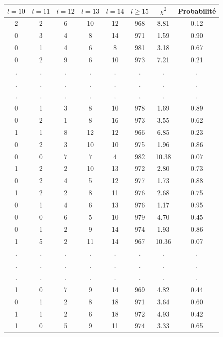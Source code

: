 \documentclass[12pt,a4paper]{article}
\begin{document}
\begin{center}
\begin{tabular}{|c|c|c|c|c|c|c|c|}
\hline
$l = 10$ & $l = 11$ & $l = 12$ & $l = 13$ & $l = 14$ & $l \geq 15$ & $\chi^2$ & Probabilité \\ \hline
2 & 2 & 6 & 10 & 12 & 968 &  8.81 &  0.12\\ \hline
0 & 3 & 4 & 8 & 14 & 971 &  1.59 &  0.90\\ \hline
0 & 1 & 4 & 6 & 8 & 981 &  3.18 &  0.67\\ \hline
0 & 2 & 9 & 6 & 10 & 973 &  7.21 &  0.21\\ \hline
 . & . & . & . & . & . & . & .\\ \hline
 . & . & . & . & . & . & . & .\\ \hline
 . & . & . & . & . & . & . & .\\ \hline
0 & 1 & 3 & 8 & 10 & 978 &  1.69 &  0.89\\ \hline
0 & 2 & 1 & 8 & 16 & 973 &  3.55 &  0.62\\ \hline
1 & 1 & 8 & 12 & 12 & 966 &  6.85 &  0.23\\ \hline
0 & 2 & 3 & 10 & 10 & 975 &  1.96 &  0.86\\ \hline
0 & 0 & 7 & 7 & 4 & 982 & 10.38 &  0.07\\ \hline
1 & 2 & 2 & 10 & 13 & 972 &  2.80 &  0.73\\ \hline
0 & 2 & 4 & 5 & 12 & 977 &  1.73 &  0.88\\ \hline
1 & 2 & 2 & 8 & 11 & 976 &  2.68 &  0.75\\ \hline
0 & 1 & 4 & 6 & 13 & 976 &  1.17 &  0.95\\ \hline
0 & 0 & 6 & 5 & 10 & 979 &  4.70 &  0.45\\ \hline
0 & 1 & 2 & 9 & 14 & 974 &  1.93 &  0.86\\ \hline
1 & 5 & 2 & 11 & 14 & 967 & 10.36 &  0.07\\ \hline
 . & . & . & . & . & . & . & .\\ \hline
 . & . & . & . & . & . & . & .\\ \hline
 . & . & . & . & . & . & . & .\\ \hline
1 & 0 & 7 & 9 & 14 & 969 &  4.82 &  0.44\\ \hline
0 & 1 & 2 & 8 & 18 & 971 &  3.64 &  0.60\\ \hline
1 & 1 & 2 & 6 & 18 & 972 &  4.93 &  0.42\\ \hline
1 & 0 & 5 & 9 & 11 & 974 &  3.33 &  0.65\\ \hline
\end{tabular}
\end{center}
\end{document}
